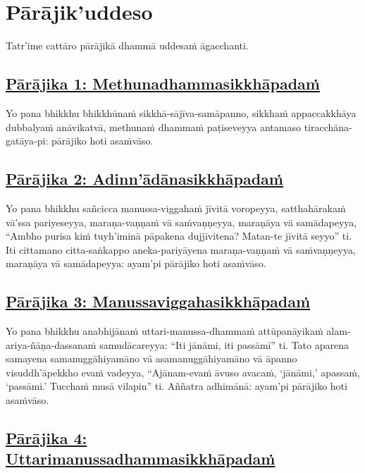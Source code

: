 \section{Pārājik'uddeso}
\label{par}

\begin{intro}
  Tatr'ime cattāro pārājikā dhammā uddesaṁ āgacchanti.
\end{intro}

\setsubsecheadstyle{\subsubsectionFmt}
\subsection*{\hyperref[disq1]{Pārājika 1: Methunadhammasikkhāpadaṁ}}
\label{par1}

Yo pana bhikkhu bhikkhūnaṁ sikkhā-sājīva-samāpanno, sikkhaṁ appaccakkhāya dubbalyaṁ anāvikatvā, methunaṁ dhammaṁ paṭiseveyya antamaso tiracchāna-gatāya-pi: pārājiko hoti asaṁvāso.

\subsection*{\hyperref[disq2]{Pārājika 2: Adinn'ādānasikkhāpadaṁ}}
\label{par2}

Yo pana bhikkhu sañcicca manussa-viggahaṁ jīvitā voropeyya, satthahārakaṁ vā'ssa pariyeseyya, maraṇa-vaṇṇaṁ vā saṁvaṇṇeyya, maraṇāya vā samādapeyya, “Ambho purisa kiṁ tuyh'iminā pāpakena dujjīvitena? Matan-te jīvitā seyyo” ti. Iti cittamano citta-saṅkappo aneka-pariyāyena maraṇa-vaṇṇaṁ vā saṁvaṇṇeyya, maraṇāya vā samādapeyya: ayam'pi pārājiko hoti asaṁvāso.

\subsection*{\hyperref[disq3]{Pārājika 3: Manussaviggahasikkhāpadaṁ}}
\label{par3}

Yo pana bhikkhu anabhijānaṁ uttari-manussa-dhammaṁ attūpanāyikaṁ alam-ariya-ñāṇa-dassanaṁ samudācareyya: “Iti jānāmi, iti passāmī” ti. Tato aparena samayena samanuggāhiyamāno vā asamanuggāhiyamāno vā āpanno visuddh'āpekkho evaṁ vadeyya, “Ajānam-evaṁ āvuso avacaṁ, ‘jānāmi,' apassaṁ, ‘passāmi.' Tucchaṁ musā vilapin” ti. Aññatra adhimānā: ayam'pi pārājiko hoti asaṁvāso.

\subsection*{\hyperref[disq4]{Pārājika 4: Uttarimanussadhammasikkhāpadaṁ}}
\label{par4}

